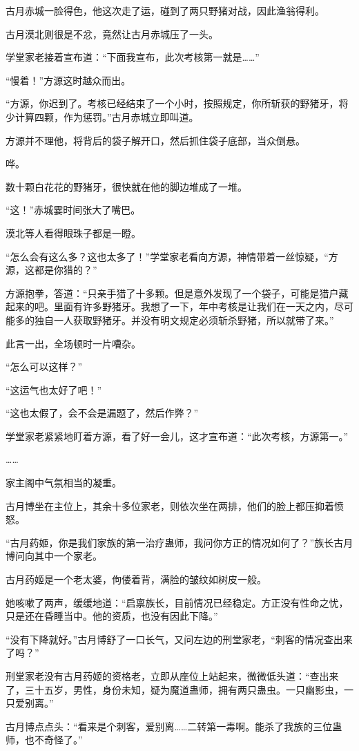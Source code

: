 \begin{this_body}
古月赤城一脸得色，他这次走了运，碰到了两只野猪对战，因此渔翁得利。

古月漠北则很是不忿，竟然让古月赤城压了一头。

学堂家老接着宣布道：“下面我宣布，此次考核第一就是……”

“慢着！”方源这时越众而出。

“方源，你迟到了。考核已经结束了一个小时，按照规定，你所斩获的野猪牙，将少计算四颗，作为惩罚。”古月赤城立即叫道。

方源并不理他，将背后的袋子解开口，然后抓住袋子底部，当众倒悬。

哗。

数十颗白花花的野猪牙，很快就在他的脚边堆成了一堆。

“这！”赤城霎时间张大了嘴巴。

漠北等人看得眼珠子都是一瞪。

“怎么会有这么多？这也太多了！”学堂家老看向方源，神情带着一丝惊疑，“方源，这都是你猎的？”

方源抱拳，答道：“只亲手猎了十多颗。但是意外发现了一个袋子，可能是猎户藏起来的吧。里面有许多野猪牙。我想了一下，年中考核是让我们在一天之内，尽可能多的独自一人获取野猪牙。并没有明文规定必须斩杀野猪，所以就带了来。”

此言一出，全场顿时一片嘈杂。

“怎么可以这样？”

“这运气也太好了吧！”

“这也太假了，会不会是漏题了，然后作弊？”

学堂家老紧紧地盯着方源，看了好一会儿，这才宣布道：“此次考核，方源第一。”

……

家主阁中气氛相当的凝重。

古月博坐在主位上，其余十多位家老，则依次坐在两排，他们的脸上都压抑着愤怒。

“古月药姬，你是我们家族的第一治疗蛊师，我问你方正的情况如何了？”族长古月博问向其中一个家老。

古月药姬是一个老太婆，佝偻着背，满脸的皱纹如树皮一般。

她咳嗽了两声，缓缓地道：“启禀族长，目前情况已经稳定。方正没有性命之忧，只是还在昏睡当中。他的资质，也没有因此下降。”

“没有下降就好。”古月博舒了一口长气，又问左边的刑堂家老，“刺客的情况查出来了吗？”

刑堂家老没有古月药姬的资格老，立即从座位上站起来，微微低头道：“查出来了，三十五岁，男性，身份未知，疑为魔道蛊师，拥有两只蛊虫。一只幽影虫，一只爱别离。”

古月博点点头：“看来是个刺客，爱别离……二转第一毒啊。能杀了我族的三位蛊师，也不奇怪了。”


\end{this_body}
